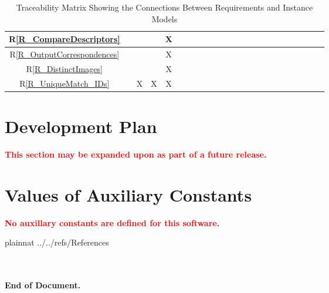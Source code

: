 \documentclass[12pt]{article}
\newcommand{\rref}[1]{R\ref{#1}}
\begin{document}
\begin{landscape}
\begin{table}[h!]
\begin{tabular}{|c|c|c|c|c|c|c|c|c|c|c|c|c|c|c|c|c|c|c|c|c|c|c|}
\rref{R_CompareDescriptors}     & & & &X& & & & & & & & & & & & & & & \\ \hline
\rref{R_OutputCorrespondences}  & & & &X& & & & & & & & & & & & & & & \\ \hline
\rref{R_DistinctImages}         & & & &X& & & & & & & & & & & & & & & \\ \hline
\rref{R_UniqueMatch_IDs}        & &X&X&X& & & & & & & & & & & & & & & \\ \hline
\hline
\end{tabular}
\caption{Traceability Matrix Showing the Connections Between Requirements and Instance Models}
\label{Table:R_trace}
\end{table}
\end{landscape}

\section{Development Plan}
\textcolor{red}{\textbf{This section may be expanded upon as part of a future release.}}

\section{Values of Auxiliary Constants}
\textcolor{red}{\textbf{No auxillary constants are defined for this software.}}

\newpage

 {plainnat}
 {../../refs/References}

\newpage
\textbf{\\ \\ End of Document.}
\end{document}
